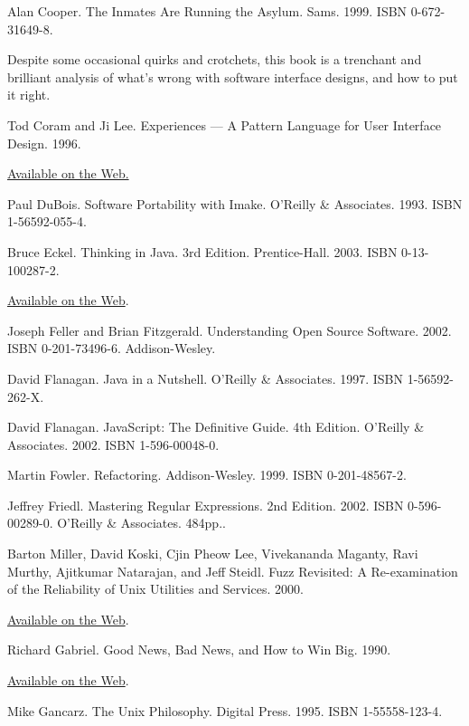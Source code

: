\documentclass[12pt,oneside]{book}
\begin{document}
\begin{common-format}
\begin{thebibliography}{9}
 Alan Cooper. The Inmates Are Running the Asylum. Sams. 1999. ISBN 0-672-31649-8.

Despite some occasional quirks and crotchets, this book is a trenchant and brilliant analysis of what's wrong with software interface designs, and how to put it right.

 Tod Coram and Ji Lee. Experiences — A Pattern Language for User Interface Design. 1996.

\href{http://www.maplefish.com/todd/papers/Experiences.html}{Available on the Web.}

 Paul DuBois. Software Portability with Imake. O'Reilly \&{} Associates. 1993. ISBN 1-56592-055-4.

 Bruce Eckel. Thinking in Java. 3rd Edition. Prentice-Hall. 2003. ISBN 0-13-100287-2.

\href{http://www.mindview.net/Books/TIJ/}{Available on the Web}.

 Joseph Feller and Brian Fitzgerald. Understanding Open Source Software. 2002. ISBN 0-201-73496-6. Addison-Wesley.

 David Flanagan. Java in a Nutshell. O'Reilly \&{} Associates. 1997. ISBN 1-56592-262-X.

 David Flanagan. JavaScript: The Definitive Guide. 4th Edition. O'Reilly \&{} Associates. 2002. ISBN 1-596-00048-0.

 Martin Fowler. Refactoring. Addison-Wesley. 1999. ISBN 0-201-48567-2.

 Jeffrey Friedl. Mastering Regular Expressions. 2nd Edition. 2002. ISBN 0-596-00289-0. O'Reilly \&{} Associates. 484pp..

 Barton Miller, David Koski, Cjin Pheow Lee, Vivekananda Maganty, Ravi Murthy, Ajitkumar Natarajan, and Jeff Steidl. Fuzz Revisited: A Re-examination of the Reliability of Unix Utilities and Services. 2000.

\href{http://www.opensource.org/advocacy/fuzz-revisited.pdf}{Available on the Web}.

 Richard Gabriel. Good News, Bad News, and How to Win Big. 1990.

\href{http://www.dreamsongs.com/WorseIsBetter.html}{Available on the Web}.

 Mike Gancarz. The Unix Philosophy. Digital Press. 1995. ISBN 1-55558-123-4.


\end{thebibliography}
\end{common-format}
\end{document}
